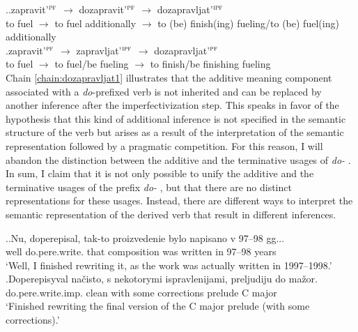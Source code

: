 \ex.\label{chain:dozapravljat}\ag.\label{chain:dozapravljat1}zapravit'$^{\textsc{pf}}$ $\rightarrow$ dozapravit'$^{\textsc{pf}}$ $\rightarrow$ dozapravljat'$^{\textsc{ipf}}$\\
{to fuel} $\rightarrow$ {to fuel additionally} $\rightarrow$ {to (be) finish(ing) fueling/to (be) fuel(ing) additionally}\\
\bg.\label{chain:dozapravljat2}zapravit'$^{\textsc{pf}}$ $\rightarrow$ zapravljat'$^{\textsc{ipf}}$ $\rightarrow$ dozapravljat'$^{\textsc{pf}}$\\
{to fuel} $\rightarrow$ {to fuel/be fueling} $\rightarrow$ {to finish/be finishing fueling}\\

Chain \ref{chain:dozapravljat1} illustrates that the additive meaning component associated with a \textit{do}-prefixed verb is not inherited and can be replaced by another inference after the imperfectivization  step. This speaks in favor of the hypothesis that this kind of additional inference is not specified in the semantic structure of the verb but arises as a result of the interpretation of the semantic representation followed by a pragmatic competition. For this reason, I will abandon the distinction between the additive and the terminative  usages of \textit{do-}  . In sum, I claim that it is not only possible to unify the additive and the terminative  usages of the prefix \textit{do-}  , but that there are no distinct representations for these usages. Instead, there are different ways to interpret the semantic representation of the derived verb that result in different inferences. 

\ex.\ag.\label{ex:do:pere1}Nu, doperepisal, tak-to proizvedenie bylo napisano v 97--98 gg...\\
well do.pere.write. that composition was written in 97--98 years\\
\trans `Well, I finished rewriting it, as the work was actually written in 1997--1998.'
\bg.\label{ex:do:pere2}Doperepisyval na\v{c}isto, s nekotorymi ispravlenijami, preljudiju do ma\v{z}or.\\
do.pere.write.imp. clean with some corrections prelude C major\\
\trans `Finished rewriting the final version of the C major prelude (with some corrections).'

